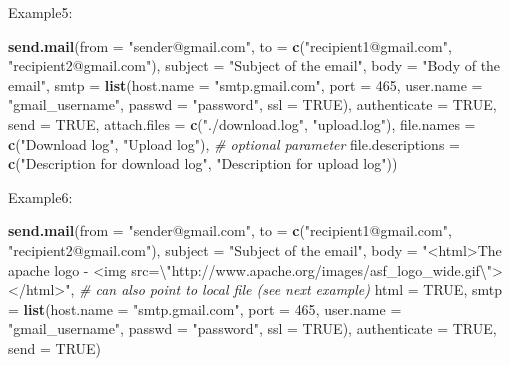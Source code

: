 \documentclass[]{book}
\newenvironment{Shaded}{\begin{snugshade}}{\end{snugshade}}
\newcommand{\KeywordTok}[1]{\textcolor[rgb]{0.13,0.29,0.53}{\textbf{#1}}}
\newcommand{\DataTypeTok}[1]{\textcolor[rgb]{0.13,0.29,0.53}{#1}}
\newcommand{\DecValTok}[1]{\textcolor[rgb]{0.00,0.00,0.81}{#1}}
\newcommand{\CharTok}[1]{\textcolor[rgb]{0.31,0.60,0.02}{#1}}
\newcommand{\StringTok}[1]{\textcolor[rgb]{0.31,0.60,0.02}{#1}}
\newcommand{\CommentTok}[1]{\textcolor[rgb]{0.56,0.35,0.01}{\textit{#1}}}
\newcommand{\OtherTok}[1]{\textcolor[rgb]{0.56,0.35,0.01}{#1}}
\newcommand{\NormalTok}[1]{#1}
\theoremstyle{definition}
\theoremstyle{definition}
\theoremstyle{definition}
\theoremstyle{remark}
\begin{document}
Example5:

\begin{Shaded}
\begin{Highlighting}[]

\KeywordTok{send.mail}\NormalTok{(}\DataTypeTok{from =} \StringTok{"sender@gmail.com"}\NormalTok{,}
          \DataTypeTok{to =} \KeywordTok{c}\NormalTok{(}\StringTok{"recipient1@gmail.com"}\NormalTok{, }\StringTok{"recipient2@gmail.com"}\NormalTok{),}
          \DataTypeTok{subject =} \StringTok{"Subject of the email"}\NormalTok{,}
          \DataTypeTok{body =} \StringTok{"Body of the email"}\NormalTok{,}
          \DataTypeTok{smtp =} \KeywordTok{list}\NormalTok{(}\DataTypeTok{host.name =} \StringTok{"smtp.gmail.com"}\NormalTok{, }\DataTypeTok{port =} \DecValTok{465}\NormalTok{, }\DataTypeTok{user.name =} \StringTok{"gmail_username"}\NormalTok{, }\DataTypeTok{passwd =} \StringTok{"password"}\NormalTok{, }\DataTypeTok{ssl =} \OtherTok{TRUE}\NormalTok{),}
          \DataTypeTok{authenticate =} \OtherTok{TRUE}\NormalTok{,}
          \DataTypeTok{send =} \OtherTok{TRUE}\NormalTok{,}
          \DataTypeTok{attach.files =} \KeywordTok{c}\NormalTok{(}\StringTok{"./download.log"}\NormalTok{, }\StringTok{"upload.log"}\NormalTok{),}
          \DataTypeTok{file.names =} \KeywordTok{c}\NormalTok{(}\StringTok{"Download log"}\NormalTok{, }\StringTok{"Upload log"}\NormalTok{), }\CommentTok{# optional parameter}
          \DataTypeTok{file.descriptions =} \KeywordTok{c}\NormalTok{(}\StringTok{"Description for download log"}\NormalTok{, }\StringTok{"Description for upload log"}\NormalTok{))}
\end{Highlighting}
\end{Shaded}

Example6:

\begin{Shaded}
\begin{Highlighting}[]
\KeywordTok{send.mail}\NormalTok{(}\DataTypeTok{from =} \StringTok{"sender@gmail.com"}\NormalTok{,}
          \DataTypeTok{to =} \KeywordTok{c}\NormalTok{(}\StringTok{"recipient1@gmail.com"}\NormalTok{, }\StringTok{"recipient2@gmail.com"}\NormalTok{),}
          \DataTypeTok{subject =} \StringTok{"Subject of the email"}\NormalTok{,}
          \DataTypeTok{body =} \StringTok{"<html>The apache logo - <img src=}\CharTok{\textbackslash{}"}\StringTok{http://www.apache.org/images/asf_logo_wide.gif}\CharTok{\textbackslash{}"}\StringTok{></html>"}\NormalTok{, }\CommentTok{# can also point to local file (see next example)}
          \DataTypeTok{html =} \OtherTok{TRUE}\NormalTok{,}
          \DataTypeTok{smtp =} \KeywordTok{list}\NormalTok{(}\DataTypeTok{host.name =} \StringTok{"smtp.gmail.com"}\NormalTok{, }\DataTypeTok{port =} \DecValTok{465}\NormalTok{, }\DataTypeTok{user.name =} \StringTok{"gmail_username"}\NormalTok{, }\DataTypeTok{passwd =} \StringTok{"password"}\NormalTok{, }\DataTypeTok{ssl =} \OtherTok{TRUE}\NormalTok{),}
          \DataTypeTok{authenticate =} \OtherTok{TRUE}\NormalTok{,}
          \DataTypeTok{send =} \OtherTok{TRUE}\NormalTok{)}
\end{Highlighting}
\end{Shaded}
\end{document}
